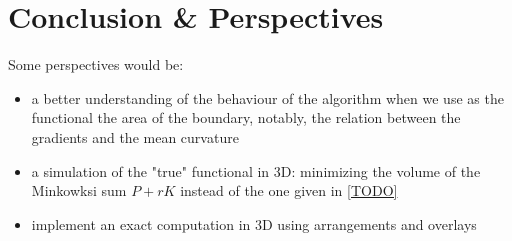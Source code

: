\chapter{Conclusion \& Perspectives}


Some perspectives would be:
\begin{itemize}
    \item a better understanding of the behaviour of the algorithm when we use
        as the functional the area of the boundary, notably, the relation
        between the gradients and the mean curvature
    \item a simulation of the "true" functional in 3D: minimizing the volume of
        the Minkowksi sum $ P + rK $ instead of the one given in \ref{TODO}
    \item implement an exact computation in 3D using arrangements and overlays
\end{itemize}

